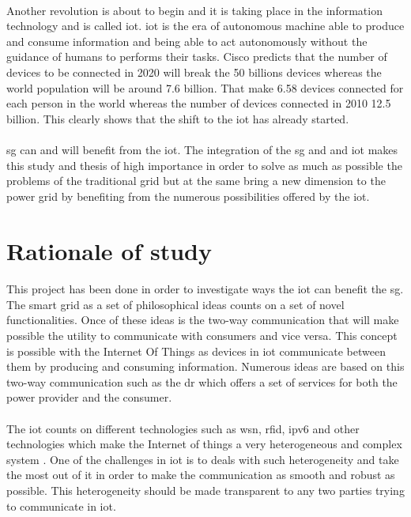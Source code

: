 \documentclass[oneside,12pt,a4paper,final]{book}
\begin{document}
\paragraph{}
Another revolution is about to begin and it is taking place in the information technology and is called \gls{iot}. \gls{iot} is the era of autonomous machine able to produce and consume information and being able to act autonomously without the guidance of humans to performs their tasks. Cisco predicts that the number of devices to be connected in 2020 will break the 50 billions devices \cite{ref3} whereas the world population will be around 7.6 billion. That make 6.58 devices connected for each person in the world whereas the number of devices connected in 2010 12.5 billion. This clearly shows that the shift to the \gls{iot} has already started.
\paragraph{}
\gls{sg} can and will benefit from the \gls{iot}. The integration of the \gls{sg} and and \gls{iot} makes this study and thesis of high importance in order to solve as much as possible the problems of the traditional grid but at the same bring a new dimension to the power grid by benefiting from the numerous possibilities offered by the \gls{iot}.

\section{Rationale of study}
\paragraph{}
This project has been done in order to investigate ways the \gls{iot} can benefit the \gls{sg}. The smart grid as a set of philosophical ideas counts on a set of novel functionalities. Once of these ideas is the two-way communication that will make possible the utility to communicate with consumers and vice versa. This concept is possible with the Internet Of Things as devices in \gls{iot} communicate between them by producing and consuming information. Numerous ideas are based on this two-way communication such as the \gls{dr} which offers a set of services for both the power provider and the consumer.
\paragraph{}
The \gls{iot} counts on different technologies such as \gls{wsn}, \gls{rfid}, \gls{ipv6} and other technologies which make the Internet of things a very heterogeneous and complex system \cite{ref4}. One of the challenges in \gls{iot} is to deals with such heterogeneity and take the most out of it in order to make the communication as smooth and robust as possible. This heterogeneity should be made transparent to any two parties trying to communicate in \gls{iot}.
\end{document}
